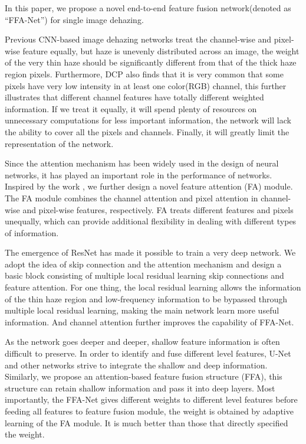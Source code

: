 \documentclass[letterpaper]{article} \usepackage{aaai20}  \usepackage{times}  \usepackage{helvet} \usepackage{courier}  \usepackage[hyphens]{url}  \usepackage{graphicx} \urlstyle{rm} \def\UrlFont{\rm}  \usepackage{graphicx}  \frenchspacing  \setlength{\pdfpagewidth}{8.5in}  \setlength{\pdfpageheight}{11in}  \usepackage{bm}
\begin{document}
In this paper, we propose a novel end-to-end feature fusion network(denoted as “FFA-Net”) for single image dehazing.

Previous CNN-based image dehazing networks treat the channel-wise and pixel-wise feature equally, but haze is unevenly distributed across an image, the weight of the very thin haze should be significantly different from that of the thick haze region pixels.  Furthermore, DCP also finds that it is very common that some pixels have very low intensity in at least one color(RGB) channel, this further illustrates that different channel features have totally different weighted information. If we treat it equally, it will spend plenty of resources on unnecessary computations for less important information, the network will lack the ability to cover all the pixels and channels. Finally, it will greatly limit the representation of the network. 



Since the attention mechanism\cite{att1}\cite{att2}\cite{att3}  has been widely used in the design of neural networks, it has played an important role in the performance of networks. Inspired by the work \cite{rcan}, we further design a novel feature attention (FA) module. The FA module combines the channel attention and pixel attention in channel-wise  and pixel-wise features,  respectively. FA treats different features and pixels unequally, which can provide additional flexibility in dealing with different types of information. 



The emergence of ResNet\cite{resnet} has made it possible to train a very deep network. We adopt the idea of skip connection and the attention mechanism and design a basic block consisting of multiple local residual learning skip connections and feature attention. For one thing, the local residual learning allows the information of the thin haze region and low-frequency information to be bypassed through multiple local residual learning, making the main network learn more useful information. And channel attention further improves the capability of FFA-Net.

As the network goes deeper and deeper, shallow feature information is often difficult to preserve. In order to identify and fuse different level features, U-Net\cite{unet} and other networks strive to integrate the shallow and deep information. Similarly,  we propose an attention-based feature fusion structure (FFA), this structure can retain shallow information and pass it into deep layers. Most importantly, the FFA-Net gives different weights to different level features before feeding all features to feature fusion module, the weight is obtained by adaptive learning of the FA module.  It is much better than those that directly specified the weight.
\end{document}
